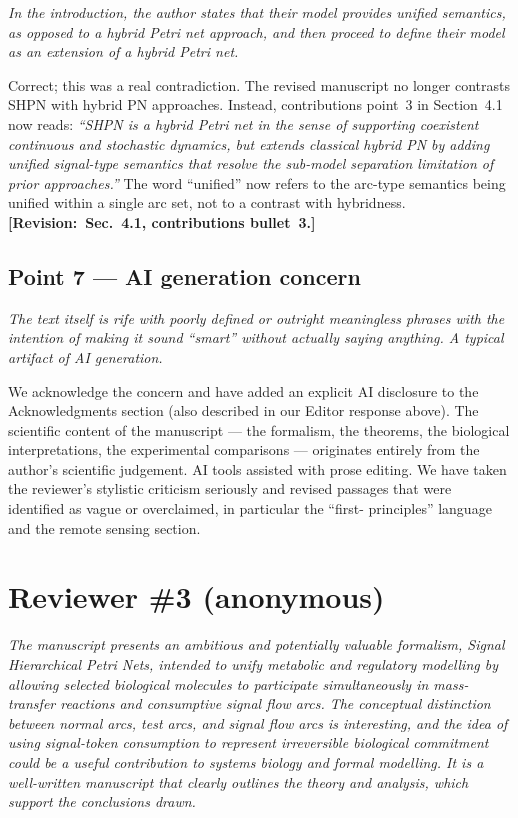 \documentclass[11pt,letterpaper]{article}
\newcommand{\rquote}[1]{\begin{mdframed}[style=reviewquote]\textit{#1}\end{mdframed}}
\newcommand{\sref}[1]{\textbf{[Revision:~#1]}}
\begin{document}
\rquote{In the introduction, the author states that their model provides unified
semantics, as opposed to a hybrid Petri net approach, and then proceed to define
their model as an extension of a hybrid Petri net.}

Correct; this was a real contradiction. The revised manuscript no longer
contrasts SHPN with hybrid PN approaches. Instead, contributions point~3 in
Section~4.1 now reads: \textit{``SHPN is a hybrid Petri net in the sense of
supporting coexistent continuous and stochastic dynamics, but extends classical
hybrid PN by adding unified signal-type semantics that resolve the sub-model
separation limitation of prior approaches.''} The word ``unified'' now refers to
the arc-type semantics being unified within a single arc set, not to a contrast
with hybridness. \sref{Sec.~4.1, contributions bullet~3.}

\subsection*{Point 7 --- AI generation concern}

\rquote{The text itself is rife with poorly defined or outright meaningless
phrases with the intention of making it sound ``smart'' without actually saying
anything. A typical artifact of AI generation.}

We acknowledge the concern and have added an explicit AI disclosure to the
Acknowledgments section (also described in our Editor response above). The
scientific content of the manuscript --- the formalism, the theorems, the
biological interpretations, the experimental comparisons --- originates entirely
from the author's scientific judgement. AI tools assisted with prose editing.
We have taken the reviewer's stylistic criticism seriously and revised passages
that were identified as vague or overclaimed, in particular the ``first-
principles'' language and the remote sensing section.

\bigskip

\section*{Reviewer \#3 (anonymous)}

\rquote{The manuscript presents an ambitious and potentially valuable formalism,
Signal Hierarchical Petri Nets, intended to unify metabolic and regulatory
modelling by allowing selected biological molecules to participate
simultaneously in mass-transfer reactions and consumptive signal flow arcs.
The conceptual distinction between normal arcs, test arcs, and signal flow arcs
is interesting, and the idea of using signal-token consumption to represent
irreversible biological commitment could be a useful contribution to systems
biology and formal modelling. It is a well-written manuscript that clearly
outlines the theory and analysis, which support the conclusions drawn.}
\end{document}
